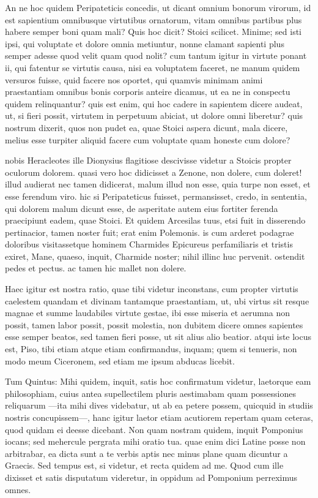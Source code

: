  An ne hoc quidem Peripateticis concedis, ut dicant omnium bonorum virorum, id est sapientium omnibusque virtutibus ornatorum, vitam omnibus partibus plus habere semper boni quam mali? Quis hoc dicit? Stoici scilicet. Minime; sed isti ipsi, qui voluptate et dolore omnia metiuntur, nonne clamant sapienti plus semper adesse quod velit quam quod nolit? cum tantum igitur in virtute ponant ii, qui fatentur se virtutis causa, nisi ea voluptatem faceret, ne manum quidem versuros fuisse, quid facere nos oportet, qui quamvis minimam animi praestantiam omnibus bonis corporis anteire dicamus, ut ea ne in conspectu quidem relinquantur? quis est enim, qui hoc cadere in sapientem dicere audeat, ut, si fieri possit, virtutem in perpetuum abiciat, ut dolore omni liberetur? quis nostrum dixerit, quos non pudet ea, quae Stoici aspera dicunt, mala dicere, melius esse turpiter aliquid facere cum voluptate quam honeste cum dolore?

 nobis Heracleotes ille Dionysius flagitiose descivisse videtur a Stoicis propter oculorum dolorem. quasi vero hoc didicisset a Zenone, non dolere, cum doleret! illud audierat nec tamen didicerat, malum illud non esse, quia turpe non esset, et esse ferendum viro. hic si Peripateticus fuisset, permansisset, credo, in sententia, qui dolorem malum dicunt esse, de asperitate autem eius fortiter ferenda praecipiunt eadem, quae Stoici. Et quidem Arcesilas tuus, etsi fuit in disserendo pertinacior, tamen noster fuit; erat enim Polemonis. is cum arderet podagrae doloribus visitassetque hominem Charmides Epicureus perfamiliaris et tristis exiret, Mane, quaeso, inquit, Charmide noster; nihil illinc huc pervenit. ostendit pedes et pectus. ac tamen hic mallet non dolere.

 Haec igitur est nostra ratio, quae tibi videtur inconstans, cum propter virtutis caelestem quandam et divinam tantamque praestantiam, ut, ubi virtus sit resque magnae et summe laudabiles virtute gestae, ibi esse miseria et aerumna non possit, tamen labor possit, possit molestia, non dubitem dicere omnes sapientes esse semper beatos, sed tamen fieri posse, ut sit alius alio beatior. atqui iste locus est, Piso, tibi etiam atque etiam confirmandus, inquam; quem si tenueris, non modo meum Ciceronem, sed etiam me ipsum abducas licebit.

 Tum Quintus: Mihi quidem, inquit, satis hoc confirmatum videtur, laetorque eam philosophiam, cuius antea supellectilem pluris aestimabam quam possessiones reliquarum —ita mihi dives videbatur, ut ab ea petere possem, quicquid in studiis nostris concupissem—, hanc igitur laetor etiam acutiorem repertam quam ceteras, quod quidam ei deesse dicebant. Non quam nostram quidem, inquit Pomponius iocans; sed mehercule pergrata mihi oratio tua. quae enim dici Latine posse non arbitrabar, ea dicta sunt a te verbis aptis nec minus plane quam dicuntur a Graecis. Sed tempus est, si videtur, et recta quidem ad me. Quod cum ille dixisset et satis disputatum videretur, in oppidum ad Pomponium perreximus omnes.
